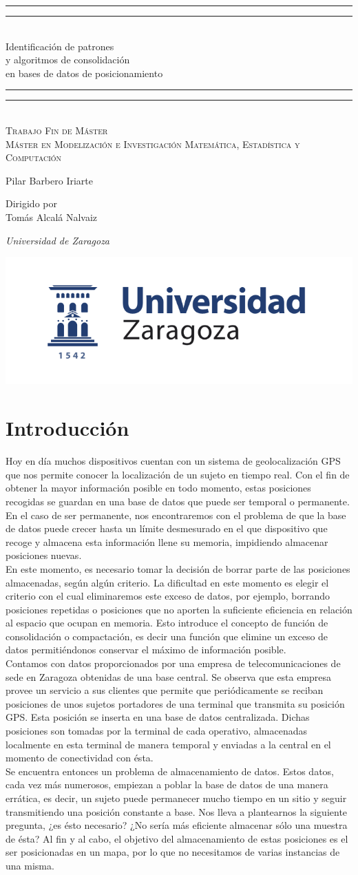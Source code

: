\documentclass[a4paper, 12pt]{article}
\newcommand*{\plogo}{\includegraphics[scale=.45]{unizar.png}}
\newcommand*{\titleGP}{\begingroup %
\centering %
\vspace*{\baselineskip} %

\rule{\textwidth}{1.6pt}\vspace*{-\baselineskip}\vspace*{2pt} %
\rule{\textwidth}{0.4pt}\\[\baselineskip] %

{\LARGE Identificaci\'on de patrones \\[0.1\baselineskip] y algoritmos  de consolidaci\'on  \\[0.3\baselineskip] en bases de datos de posicionamiento}\\[0.2\baselineskip] %

\rule{\textwidth}{0.4pt}\vspace*{-\baselineskip}\vspace{3.2pt} %
\rule{\textwidth}{1.6pt}\\[\baselineskip] %

\scshape %
Trabajo Fin de M\'aster \\ %
M\'aster en Modelizaci\'on e Investigaci\'on Matem\'atica, Estad\'istica y Computaci\'on\\[\baselineskip] %
{\Large Pilar Barbero Iriarte\par} 

\vspace*{2\baselineskip} %

Dirigido por \\[\baselineskip]
Tom\'as Alcal\'a Nalvaiz \par %
{\itshape Universidad de Zaragoza\par} %

\vfill %

\plogo \\[0.3\baselineskip] %

\endgroup}
\begin{document}
\titleGP %
\pagestyle{empty} %

\newpage\null\thispagestyle{empty}\newpage

\tableofcontents


\pagebreak


\section{Introducci\'on}

Hoy en d\'ia muchos dispositivos cuentan con un sistema de geolocalizaci\'on GPS que nos permite conocer la localizaci\'on de un sujeto en tiempo real. Con el fin de obtener la mayor informaci\'on posible en todo momento, estas posiciones recogidas se guardan en una base de datos que puede ser temporal o permanente. En el caso de ser permanente, nos encontraremos con el problema de que la base de datos puede crecer hasta un l\'imite desmesurado en el que dispositivo que recoge y almacena esta informaci\'on llene su memoria, impidiendo almacenar posiciones nuevas. \\

En este momento, es necesario tomar la decisi\'on de borrar parte de las posiciones almacenadas, seg\'un alg\'un criterio. La dificultad en este momento es elegir el criterio con el cual eliminaremos este exceso de datos, por ejemplo, borrando posiciones repetidas o posiciones que no aporten la suficiente eficiencia en relaci\'on al espacio que ocupan en memoria. Esto introduce el concepto de funci\'on de consolidaci\'on o compactaci\'on, es decir una funci\'on que elimine un exceso de datos permiti\'endonos conservar el m\'aximo de informaci\'on posible. \\

Contamos con datos proporcionados por una empresa de telecomunicaciones de sede en Zaragoza obtenidas de una base central. Se observa que esta empresa provee un servicio a sus clientes que permite que peri\'odicamente se reciban posiciones de unos sujetos portadores de una terminal que transmita su posici\'on GPS. Esta posici\'on se inserta en una base de datos centralizada. Dichas posiciones son tomadas por la terminal de cada operativo, almacenadas localmente en esta terminal de manera temporal y enviadas a la central en el momento de conectividad con \'esta. \\

Se encuentra entonces un problema de almacenamiento de datos. Estos datos, cada vez m\'as numerosos, empiezan a poblar la base de datos de una manera err\'atica, es decir, un sujeto puede permanecer mucho tiempo en un sitio y seguir transmitiendo una posici\'on constante a base. Nos lleva a plantearnos la siguiente pregunta, ¿es \'esto necesario? ¿No ser\'ia m\'as eficiente almacenar s\'olo una muestra de \'esta? Al fin y al cabo, el objetivo del almacenamiento de estas posiciones es el ser posicionadas en un mapa, por lo que no necesitamos de varias instancias de una misma. \\
\end{document}
